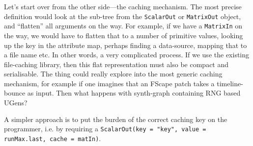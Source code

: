 \documentclass[11pt,a4paper]{article}
\begin{document}
Let's start over from the other side---the caching mechanism. The most precise definition would look at the sub-tree from the \Verb!ScalarOut! or \Verb!MatrixOut! object, and ``flatten'' all arguments on the way. For example, if we have a \Verb!MatrixIn! on the way, we would have to flatten that to a number of primitive values, looking up the key in the attribute map, perhaps finding a data-source, mapping that to a file name etc. In other words, a very complicated process. If we use the existing file-caching library, then this flat representation must also be compact and serialisable. The thing could really explore into the most generic caching mechanism, for example if one imagines that an FScape patch takes a timeline-bounce as input. Then what happens with synth-graph containing RNG based UGens?

A simpler approach is to put the burden of the correct caching key on the programmer, i.e. by requiring a \Verb!ScalarOut(key = "key", value = runMax.last, cache = matIn)!.
\end{document}
